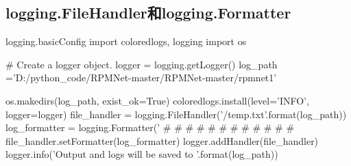 \documentclass[11pt]{article}
\begin{document}
\subsection{logging.FileHandler和logging.Formatter}
\begin{Python1}{logging.basicConfig}
import coloredlogs, logging
import os

# Create a logger object.
logger = logging.getLogger()
log_path ='D:/python_code/RPMNet-master/RPMNet-master/rpmnet1'

os.makedirs(log_path, exist_ok=True)
coloredlogs.install(level='INFO', logger=logger)
file_handler = logging.FileHandler('{}/temp.txt'.format(log_path))
log_formatter = logging.Formatter('%
#%
#%
#%
#%
#%
#%
#%
#%
#%
#%
#%
#%
file_handler.setFormatter(log_formatter)
logger.addHandler(file_handler)
logger.info('Output and logs will be saved to {}'.format(log_path))
\end{Python1}
\end{document}
